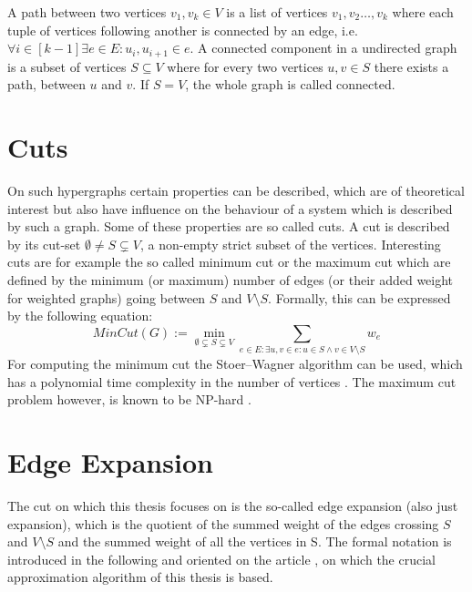  
A path between two vertices $v_1,v_k\in V$ is a list of vertices $v_1, v_2 \ldots , v_k$ where each tuple of vertices following another is connected by an edge, i.e. $\forall i \in [k-1]\exists e \in E: u_i, u_{i+1} \in e  $.
A connected component in a undirected graph is a subset of vertices $S\subseteq V$  where for every two vertices $u,v \in S$ there exists a path, between $u$ and $v$. If $S=V$, the whole graph is called connected.

\section{Cuts}
On such hypergraphs certain properties can be described, which are of theoretical interest but also have influence on the behaviour of a system which is described by such a graph. Some of these properties are so called cuts. A cut is described by its cut-set $\emptyset \neq S \subsetneq V$, a non-empty strict subset of the vertices. Interesting cuts are for example the so called minimum cut or the maximum cut which are defined by the minimum (or maximum) number of edges (or their added weight for weighted graphs) going between $S$ and $V \setminus S$. Formally, this can be expressed by the following equation: \begin{equation}
MinCut(G) := \min_{\emptyset \subsetneq S \subsetneq V} \sum_{e\in E:\exists u, v \in e: u \in S \land v \in V \setminus S } w_e
\end{equation}
For computing the minimum cut the Stoer–Wagner algorithm can be used, which has a polynomial time complexity in the number of vertices \cite{stoer1997simple}.
The maximum cut problem however, is known to be NP-hard \cite{karp1972reducibility}.

\section{Edge Expansion}
The cut on which this thesis focuses on is the so-called edge expansion (also just expansion), which is the quotient of the summed weight of the edges crossing $S$ and $V\setminus S$ and the summed weight of all the vertices in S. The formal notation is introduced in the following and oriented on the article \cite{ChanLTZ16}, on which the crucial approximation algorithm of this thesis is based.

